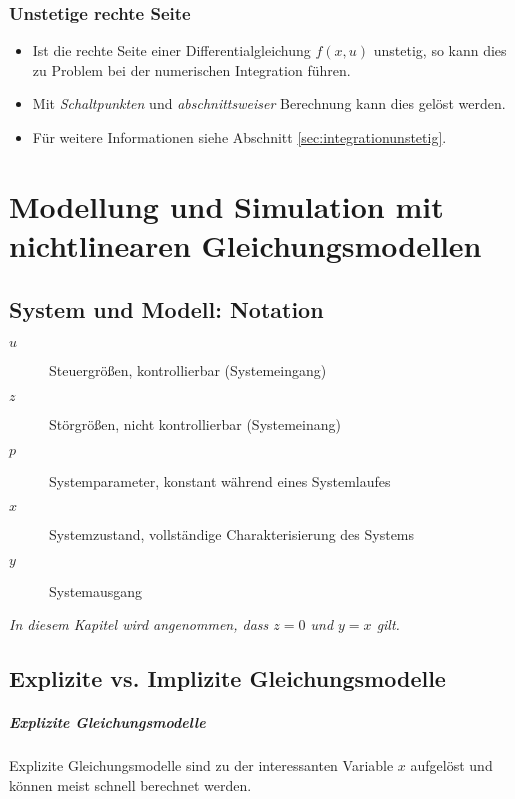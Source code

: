 		\subsection{Unstetige rechte Seite} %
			\begin{itemize}
				\item Ist die rechte Seite einer Differentialgleichung \( f(x, u) \) unstetig, so kann dies zu Problem bei der numerischen Integration führen.
				\item Mit \textit{Schaltpunkten} und \textit{abschnittsweiser} Berechnung kann dies gelöst werden.
				\item Für weitere Informationen siehe Abschnitt \ref{sec:integrationunstetig}.
			\end{itemize}

\chapter{Modellung und Simulation mit nichtlinearen Gleichungsmodellen} %
	\section{System und Modell: Notation} %
		\begin{description}
			\item[\(u\)] Steuergrößen, kontrollierbar (Systemeingang)
			\item[\(z\)] Störgrößen, nicht kontrollierbar (Systemeinang)
			\item[\(p\)] Systemparameter, konstant während eines Systemlaufes
			\item[\(x\)] Systemzustand, vollständige Charakterisierung des Systems
			\item[\(y\)] Systemausgang
		\end{description}


		\textit{In diesem Kapitel wird angenommen, dass \( z = 0 \) und \( y = x \) gilt.}

	\section{Explizite vs. Implizite Gleichungsmodelle} %
		\paragraph{Explizite Gleichungsmodelle}
			Explizite Gleichungsmodelle sind zu der interessanten Variable \( x \) aufgelöst und können meist schnell berechnet werden.

